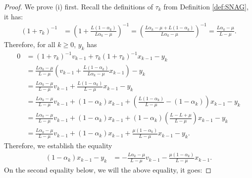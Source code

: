 \documentclass[12pt]{article}
\begin{document}
        \begin{proof}
            We prove (i) first. 
            Recall the definitions of $\tau_k$ from Definition \ref{def:SNAG}, it has: 
            \begin{align*}
                (1 + \tau_k)^{-1}
                &=
                \left(
                    1 + \frac{L(1 - \alpha_k)}{L\alpha_k - \mu}
                \right)^{-1} = \left(
                    \frac{L\alpha_k - \mu + L(1 - \alpha_k)}{L\alpha_k - \mu}
                \right)^{-1}
                = \frac{L\alpha_k - \mu}{L - \mu}. 
            \end{align*}
            Therefore, for all $k \ge 0$, $y_k$ has 
            \begin{align*}
                0 &= (1 + \tau_k)^{-1} v_{k - 1} + \tau_k (1 + \tau_k)^{-1} x_{k - 1} - y_k
                \\
                &= \frac{L\alpha_k - \mu}{L - \mu} 
                \left(
                    v_{k - 1} + \frac{L(1 - \alpha_k)}{L\alpha_k - \mu} x_{k - 1}
                \right) - y_k
                \\
                &= \frac{L\alpha_k - \mu}{L - \mu} v_{k - 1}
                + \frac{L(1 - \alpha_k)}{L - \mu} x_{k - 1} - y_k
                \\
                &= \frac{L\alpha_k - \mu}{L - \mu} v_{k - 1} + (1 - \alpha_k)x_{k - 1}
                + 
                \left(
                    \frac{L(1 - \alpha_k)}{L - \mu} - (1 - \alpha_k)
                \right) x_{k - 1} - y_k
                \\
                &= \frac{L\alpha_k - \mu}{L - \mu} v_{k - 1} + (1 - \alpha_k)x_{k - 1}
                + 
                (1 - \alpha_k)\left(
                    \frac{L - L + \mu}{L - \mu}
                \right) x_{k - 1} - y_k
                \\
                &= \frac{L\alpha_k - \mu}{L - \mu} v_{k - 1} + (1 - \alpha_k)x_{k - 1}
                + 
                \frac{\mu(1 - \alpha_k)}{L - \mu}x_{k - 1} - y_k. 
            \end{align*}
            Therefore, we establish the equality 
            \begin{align*}
                (1 - \alpha_k)x_{k - 1} - y_k &= 
                - \frac{L\alpha_k - \mu}{L - \mu} v_{k - 1} 
                - \frac{\mu(1 - \alpha_k)}{L - \mu} x_{k - 1}. 
            \end{align*}
            On the second equality below, we will the above equality, it goes: 

\end{proof}
\end{document}

